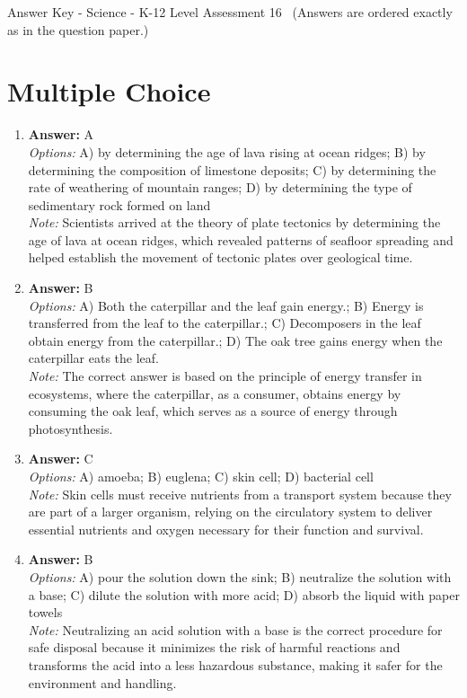 \documentclass[12pt]{article}
\begin{document}
\begin{center}
Answer Key - Science - K-12 Level Assessment 16 \
\small (Answers are ordered exactly as in the question paper.)
\end{center}

\section*{Multiple Choice}
\begin{enumerate}[label=\arabic*.]
\item \textbf{Answer:} A
\\ \textit{Options:} A) by determining the age of lava rising at ocean ridges; B) by determining the composition of limestone deposits; C) by determining the rate of weathering of mountain ranges; D) by determining the type of sedimentary rock formed on land
\\ \textit{Note:} Scientists arrived at the theory of plate tectonics by determining the age of lava at ocean ridges, which revealed patterns of seafloor spreading and helped establish the movement of tectonic plates over geological time.
\item \textbf{Answer:} B
\\ \textit{Options:} A) Both the caterpillar and the leaf gain energy.; B) Energy is transferred from the leaf to the caterpillar.; C) Decomposers in the leaf obtain energy from the caterpillar.; D) The oak tree gains energy when the caterpillar eats the leaf.
\\ \textit{Note:} The correct answer is based on the principle of energy transfer in ecosystems, where the caterpillar, as a consumer, obtains energy by consuming the oak leaf, which serves as a source of energy through photosynthesis.
\item \textbf{Answer:} C
\\ \textit{Options:} A) amoeba; B) euglena; C) skin cell; D) bacterial cell
\\ \textit{Note:} Skin cells must receive nutrients from a transport system because they are part of a larger organism, relying on the circulatory system to deliver essential nutrients and oxygen necessary for their function and survival.
\item \textbf{Answer:} B
\\ \textit{Options:} A) pour the solution down the sink; B) neutralize the solution with a base; C) dilute the solution with more acid; D) absorb the liquid with paper towels
\\ \textit{Note:} Neutralizing an acid solution with a base is the correct procedure for safe disposal because it minimizes the risk of harmful reactions and transforms the acid into a less hazardous substance, making it safer for the environment and handling.

\end{enumerate}
\end{document}
